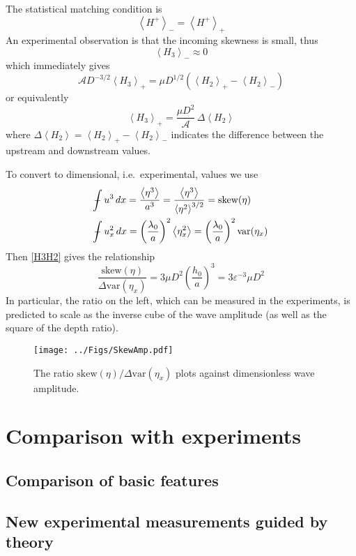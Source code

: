 \documentclass[11pt]{article}
\newcommand{\mean}[1]{\left< #1 \right>}
\newcommand{\eps}{\varepsilon}
\newcommand{\skw}{\text{skew}}
\newcommand{\var}{\text{var}}
\newcommand{\ampp}{\mathcal{A}}
\newcommand{\Hp}{H^{+}}
\newcommand{\meanup}[1]{\mean{#1}_{-}}
\newcommand{\meandn}[1]{\mean{#1}_{+}}
\def\Xint#1{\mathchoice
   {\XXint\displaystyle\textstyle{#1}}%
   {\XXint\textstyle\scriptstyle{#1}}%
   {\XXint\scriptstyle\scriptscriptstyle{#1}}%
   {\XXint\scriptscriptstyle\scriptscriptstyle{#1}}%
   \!\int}
\def\XXint#1#2#3{{\setbox0=\hbox{$#1{#2#3}{\int}$}
     \vcenter{\hbox{$#2#3$}}\kern-.5\wd0}}
\def\dashint{\Xint-}
\newcommand{\intt}{\dashint}%
\newcommand{\dx}{\, dx}
\begin{document}
The statistical matching condition is
\begin{equation}
\meanup{\Hp} = \meandn{\Hp}
\end{equation}
An experimental observation is that the incoming skewness is small, thus
\begin{equation}
\meanup{H_3} \approx 0
\end{equation}
which immediately gives
\begin{equation}
\ampp D^{-3/2} \meandn{H_3} = \mu D^{1/2} \left( \meandn{H_2} - \meanup{H_2} \right)
\end{equation}
or equivalently
\begin{equation}
\label{H3H2}
\meandn{H_3} = \frac{\mu D^{2}}{\ampp} \, \Delta \mean{H_2}
\end{equation}
where $\Delta \mean{H_2} =  \meandn{H_2} - \meanup{H_2}$  indicates the difference between the upstream and downstream values.

To convert to dimensional, i.e.~experimental, values we use
\begin{align}
& \intt u^3 \dx = \frac{\mean{\eta^3}}{a^3} = 
\frac{\mean{\eta^3}}{\mean{\eta^2}^{3/2}} = \skw(\eta) \\
& \intt u_x^2 \dx = \left(\frac{\lambda_0}{a} \right)^2 \mean{\eta_x^2} 
= \left(\frac{\lambda_0}{a} \right)^2 \var(\eta_x)
\end{align}
Then \eqref{H3H2} gives the relationship
\begin{equation}
\frac{\skw(\eta)}{\Delta \var(\eta_x)} =
3 \mu D^2 \left( \frac{h_0}{a} \right)^3 = 3 \eps^{-3} \mu D^2
\end{equation}
In particular, the ratio on the left, which can be measured in the experiments, is predicted to scale as the inverse cube of the wave amplitude (as well as the square of the depth ratio).

\begin{figure}%
\begin{center}
\texttt{[image: ../Figs/SkewAmp.pdf]}
\caption{\label{fig1} 
The ratio ${\skw(\eta)}/{\Delta \var(\eta_x)}$ plots against dimensionless wave amplitude.
}
\end{center}
\end{figure}


\section{Comparison with experiments}

\subsection{Comparison of basic features}

\subsection{New experimental measurements guided by theory}

%
%
\end{document}
